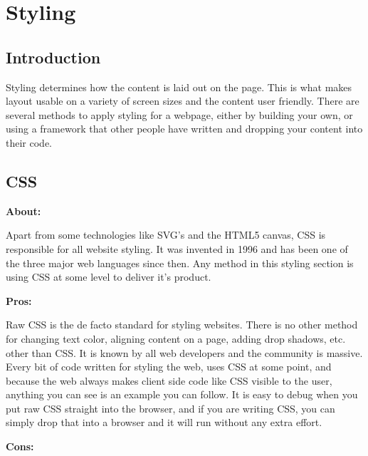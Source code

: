 \documentclass[draftclsnofoot,onecolumn,letterpaper,10pt,compsoc]{IEEEtran}
\begin{document}
\section{Styling}

  \subsection{Introduction}

    Styling determines how the content is laid out on the page.
    This is what makes layout usable on a variety of screen sizes and the content user friendly.
    There are several methods to apply styling for a webpage, either by building your own, or using a framework that other people have written and dropping your content into their code.

  \subsection{CSS}

    \textbf{About:}

    Apart from some technologies like SVG's and the HTML5 canvas, CSS is responsible for all website styling.
    It was invented in 1996 and has been one of the three major web languages since then.
    Any method in this styling section is using CSS at some level to deliver it's product.\cite{CSSHistory}

    \noindent \textbf{Pros:}

    Raw CSS is the de facto standard for styling websites.
    There is no other method for changing text color, aligning content on a page, adding drop shadows, etc. other than CSS.
    It is known by all web developers and the community is massive.
    Every bit of code written for styling the web, uses CSS at some point, and because the web always makes client side code like CSS visible to the user, anything you can see is an example you can follow.
    It is easy to debug when you put raw CSS straight into the browser, and if you are writing CSS, you can simply drop that into a browser and it will run without any extra effort.\cite{CSSProCon}

    \noindent \textbf{Cons:}
\end{document}
